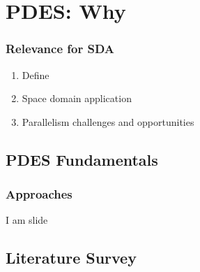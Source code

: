 % 

\section{PDES: Why}
%
\begin{frame}\frametitle{Relevance for SDA}
\begin{enumerate}
	\item Define \pdes
	\item Space domain application
	\item Parallelism challenges and opportunities
\end{enumerate}
\end{frame}

\subsection{PDES Fundamentals}
\begin{frame}\frametitle{Approaches}
	I am slide
\end{frame}

\subsection{Literature Survey}

